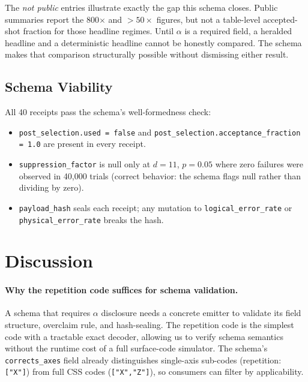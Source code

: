 \documentclass[conference]{IEEEtran}
\newcommand{\af}{\alpha}            %
\begin{document}
The \textit{not public} entries illustrate exactly the gap this schema
closes. Public summaries report the 800$\times$ and $>50\times$ figures,
but not a table-level accepted-shot fraction for those headline regimes.
Until $\af$ is a required field, a heralded headline and a deterministic
headline cannot be honestly compared. The schema makes that comparison
structurally possible without dismissing either result.

\subsection{Schema Viability}

All 40 receipts pass the schema's well-formedness check:
\begin{itemize}
  \item \texttt{post\_selection.used = false} and
    \texttt{post\_selection.acceptance\_fraction = 1.0} are present in
    every receipt.
  \item \texttt{suppression\_factor} is null only at $d{=}11$, $p{=}0.05$
    where zero failures were observed in 40,000 trials (correct behavior:
    the schema flags null rather than dividing by zero).
  \item \texttt{payload\_hash} seals each receipt; any mutation to
    \texttt{logical\_error\_rate} or \texttt{physical\_error\_rate} breaks
    the hash.
\end{itemize}

\section{Discussion}
\label{sec:discussion}

\paragraph{Why the repetition code suffices for schema validation.}
A schema that requires $\af$ disclosure needs a concrete emitter to
validate its field structure, overclaim rule, and hash-sealing. The
repetition code is the simplest code with a tractable exact decoder,
allowing us to verify schema semantics without the runtime cost of a
full surface-code simulator. The schema's \texttt{corrects\_axes} field
already distinguishes single-axis sub-codes (repetition: \texttt{["X"]})
from full CSS codes (\texttt{["X","Z"]}), so consumers can filter by
applicability.
\end{document}
